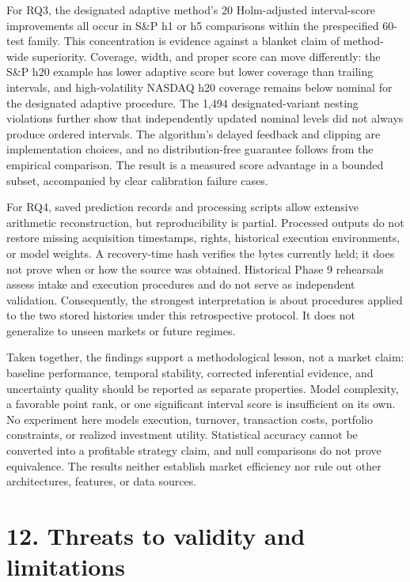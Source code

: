 \documentclass[11pt]{article}
\begin{document}
For RQ3, the designated adaptive method's 20 Holm-adjusted interval-score improvements all occur in S\&P h1 or h5 comparisons within the prespecified 60-test family. This concentration is evidence against a blanket claim of method-wide superiority. Coverage, width, and proper score can move differently: the S\&P h20 example has lower adaptive score but lower coverage than trailing intervals, and high-volatility NASDAQ h20 coverage remains below nominal for the designated adaptive procedure. The 1,494 designated-variant nesting violations further show that independently updated nominal levels did not always produce ordered intervals. The algorithm's delayed feedback and clipping are implementation choices, and no distribution-free guarantee follows from the empirical comparison. The result is a measured score advantage in a bounded subset, accompanied by clear calibration failure cases.

For RQ4, saved prediction records and processing scripts allow extensive arithmetic reconstruction, but reproducibility is partial. Processed outputs do not restore missing acquisition timestamps, rights, historical execution environments, or model weights. A recovery-time hash verifies the bytes currently held; it does not prove when or how the source was obtained. Historical Phase 9 rehearsals assess intake and execution procedures and do not serve as independent validation. Consequently, the strongest interpretation is about procedures applied to the two stored histories under this retrospective protocol. It does not generalize to unseen markets or future regimes.

Taken together, the findings support a methodological lesson, not a market claim: baseline performance, temporal stability, corrected inferential evidence, and uncertainty quality should be reported as separate properties. Model complexity, a favorable point rank, or one significant interval score is insufficient on its own. No experiment here models execution, turnover, transaction costs, portfolio constraints, or realized investment utility. Statistical accuracy cannot be converted into a profitable strategy claim, and null comparisons do not prove equivalence. The results neither establish market efficiency nor rule out other architectures, features, or data sources.

\section*{12. Threats to validity and limitations}
\end{document}
